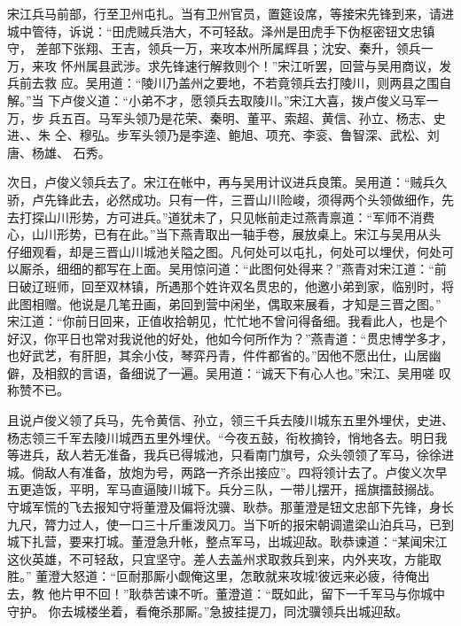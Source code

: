 宋江兵马前部，行至卫州屯扎。当有卫州官员，置筵设席，等接宋先锋到来，请进
城中管待，诉说：“田虎贼兵浩大，不可轻敌。泽州是田虎手下伪枢密钮文忠镇守，
差部下张翔、王吉，领兵一万，来攻本州所属辉县；沈安、秦升，领兵一万，来攻
怀州属县武涉。求先锋速行解救则个！”宋江听罢，回营与吴用商议，发兵前去救
应。吴用道：“陵川乃盖州之要地，不若竟领兵去打陵川，则两县之围自解。”当
下卢俊义道：“小弟不才，愿领兵去取陵川。”宋江大喜，拨卢俊义马军一万，步
兵五百。马军头领乃是花荣、秦明、董平、索超、黄信、孙立、杨志、史进、、朱
仝、穆弘。步军头领乃是李逵、鲍旭、项充、李衮、鲁智深、武松、刘唐、杨雄、
石秀。

次日，卢俊义领兵去了。宋江在帐中，再与吴用计议进兵良策。吴用道：“贼兵久
骄，卢先锋此去，必然成功。只有一件，三晋山川险峻，须得两个头领做细作，先
去打探山川形势，方可进兵。”道犹未了，只见帐前走过燕青禀道：“军师不消费
心，山川形势，已有在此。”当下燕青取出一轴手卷，展放桌上。宋江与吴用从头
仔细观看，却是三晋山川城池关隘之图。凡何处可以屯扎，何处可以埋伏，何处可
以厮杀，细细的都写在上面。吴用惊问道：“此图何处得来？”燕青对宋江道：“前
日破辽班师，回至双林镇，所遇那个姓许双名贯忠的，他邀小弟到家，临别时，将
此图相赠。他说是几笔丑画，弟回到营中闲坐，偶取来展看，才知是三晋之图。”
宋江道：“你前日回来，正值收拾朝见，忙忙地不曾问得备细。我看此人，也是个
好汉，你平日也常对我说他的好处，他如今何所作为？”燕青道：“贯忠博学多才，
也好武艺，有肝胆，其余小伎，琴弈丹青，件件都省的。”因他不愿出仕，山居幽
僻，及相叙的言语，备细说了一遍。吴用道：“诚天下有心人也。”宋江、吴用嗟
叹称赞不已。

且说卢俊义领了兵马，先令黄信、孙立，领三千兵去陵川城东五里外埋伏，史进、
杨志领三千军去陵川城西五里外埋伏。“今夜五鼓，衔枚摘铃，悄地各去。明日我
等进兵，敌人若无准备，我兵已得城池，只看南门旗号，众头领领了军马，徐徐进
城。倘敌人有准备，放炮为号，两路一齐杀出接应”。四将领计去了。卢俊义次早
五更造饭，平明，军马直逼陵川城下。兵分三队，一带儿摆开，摇旗擂鼓搦战。
守城军慌的飞去报知守将董澄及偏将沈骥、耿恭。那董澄是钮文忠部下先锋，身长
九尺，膂力过人，使一口三十斤重泼风刀。当下听的报宋朝调遣梁山泊兵马，已到
城下扎营，要来打城。董澄急升帐，整点军马，出城迎敌。耿恭谏道：“某闻宋江
这伙英雄，不可轻敌，只宜坚守。差人去盖州求取救兵到来，内外夹攻，方能取胜。”
董澄大怒道：“叵耐那厮小觑俺这里，怎敢就来攻城!彼远来必疲，待俺出去，教
他片甲不回！”耿恭苦谏不听。董澄道：“既如此，留下一千军马与你城中守护。
你去城楼坐着，看俺杀那厮。”急披挂提刀，同沈骥领兵出城迎敌。

